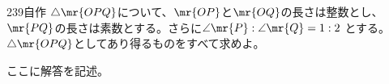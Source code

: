 \begin{thm}{239}{}{自作}
 $\triangle\mr{OPQ}$について、$\mr{OP}$と$\mr{OQ}$の長さは整数とし、$\mr{PQ}$の長さは素数とする。さらに$\angle\mr{P}:\angle\mr{Q}=1:2$ とする。$\triangle\mr{OPQ}$としてあり得るものをすべて求めよ。
\end{thm}

ここに解答を記述。